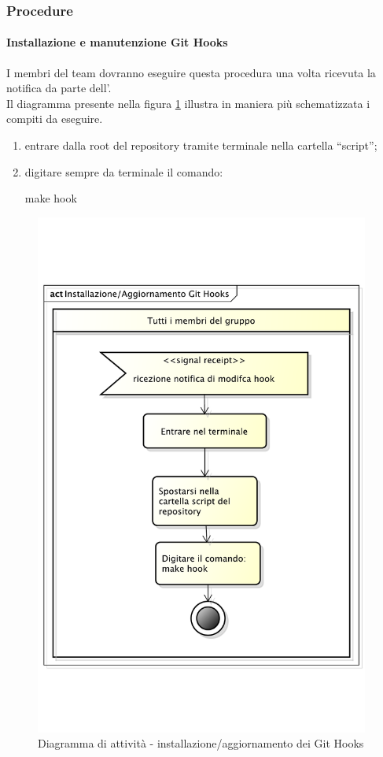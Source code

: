 				
		\subsubsection{Procedure}
			\paragraph{Installazione e manutenzione Git Hooks}
			\label{sec:installazione_git_hooks}
			I membri del team dovranno eseguire questa procedura una volta ricevuta la notifica da parte dell'\roleAdministrator. \\
			Il diagramma presente nella figura \ref{fig:installazione_git_hook} illustra in maniera più schematizzata i compiti da eseguire.
				\begin{enumerate}
					\item entrare dalla root del repository\gloss{} tramite terminale nella cartella ``script'';
					\item digitare sempre da terminale il comando:
						\begin{center}
							make hook
						\end{center}
				\end{enumerate}
						
			\begin{figure}[htbp]
				\centering
				\includegraphics[width=11cm]{images/inst_git_hook.pdf}
				\caption{Diagramma di attività - installazione/aggiornamento dei Git Hooks}
				\label{fig:installazione_git_hook}
			\end{figure}
			
